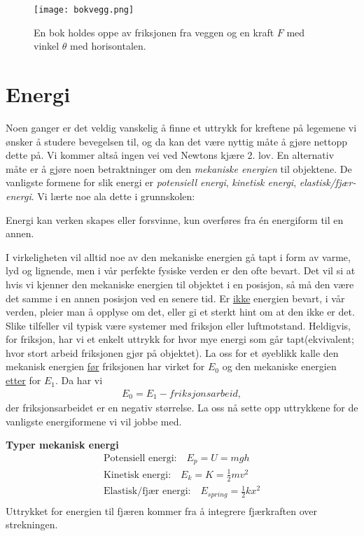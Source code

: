 \documentclass[11pt,a4paper]{article}
\numberwithin{equation}{section}
\begin{document}
\begin{figure}[h!]
\begin{center}
  \texttt{[image: bokvegg.png]}
  \end{center}
  \caption{En bok holdes oppe av friksjonen fra veggen og en kraft $F$ med vinkel $\theta$ med horisontalen.}
\end{figure}

\newpage 
 
\section{Energi}

Noen ganger er det veldig vanskelig å finne et uttrykk for kreftene på legemene vi ønsker å studere bevegelsen til, og da kan det være nyttig måte å gjøre nettopp dette på. Vi kommer altså ingen vei ved Newtons kjære 2. lov. En alternativ måte er å gjøre noen betraktninger om den \emph{mekaniske energien} til objektene. De vanligste formene for slik energi er \emph{potensiell energi}, \emph{kinetisk energi}, \emph{elastisk/fjær-energi}. Vi lærte noe ala dette i grunnskolen: 

\begin{tcolorbox}
Energi kan verken skapes eller forsvinne, kun overføres fra én energiform til en annen.
\end{tcolorbox}

I virkeligheten vil alltid noe av den mekaniske energien gå tapt i form av varme, lyd og lignende, men i vår perfekte fysiske verden er den ofte bevart. Det vil si at hvis vi kjenner den mekaniske energien til objektet i en posisjon, så må den være det samme i en annen posisjon ved en senere tid. Er \underline{ikke} energien bevart, i vår verden, pleier man å opplyse om det, eller gi et sterkt hint om at den ikke er det. Slike tilfeller vil typisk være systemer med friksjon eller luftmotstand. Heldigvis, for friksjon, har vi et enkelt uttrykk for hvor mye energi som går tapt(ekvivalent; hvor stort arbeid friksjonen gjør på objektet). La oss for et øyeblikk kalle den mekanisk energien \underline{før} friksjonen har virket for $E_0$ og den mekaniske energien \underline{etter} for $E_1$. Da har vi
\begin{align}
E_0 = E_1 - friksjonsarbeid,
\end{align} 
der friksjonsarbeidet er en negativ størrelse. La oss nå sette opp uttrykkene for de vanligste energiformene vi vil jobbe med.

\textbf{Typer mekanisk energi}
\begin{align}
\text{Potensiell energi:} \quad E_p = U = mgh \\
\text{Kinetisk energi:} \quad E_k = K = \frac{1}{2}mv^2 \\
\text{Elastisk/fjær energi:} \quad E_{spring} = \frac{1}{2}kx^2 \\
\end{align}
Uttrykket for energien til fjæren kommer fra å integrere fjærkraften over strekningen.
\end{document}
